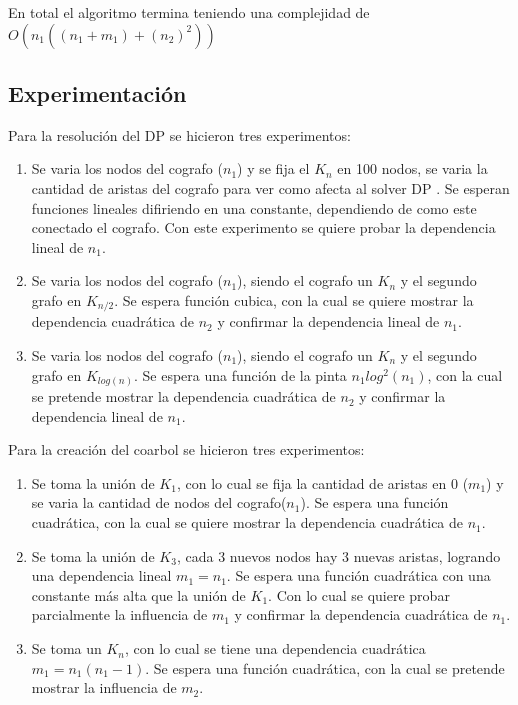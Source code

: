 En total el algoritmo termina teniendo una complejidad de $O(n_1((n_1 + m_1) + (n_2)^2 ))$

\subsection{Experimentación}

    

    Para la resolución del DP se hicieron tres experimentos:

    \begin{enumerate}

        \item Se varia los nodos del cografo ($n_1$) y se fija el $K_n$ en 100 nodos, se varia la cantidad de aristas del cografo para ver como afecta al solver DP . Se esperan funciones lineales difiriendo en una constante, dependiendo de como este conectado el cografo. Con este experimento se quiere probar la dependencia lineal de $n_1$.

        \item Se varia los nodos del cografo ($n_1$), siendo el cografo un $K_n$  y el segundo grafo en $K_{n/2}$. Se espera función cubica, con la cual se quiere mostrar la dependencia cuadrática de $n_2$ y confirmar la dependencia lineal de $n_1$.
        
        \item Se varia los nodos del cografo ($n_1$), siendo el cografo un $K_n$  y el segundo grafo en $K_{log(n)}$. Se espera una función de la pinta $n_1log^2(n_1)$, con la cual se pretende mostrar la dependencia cuadrática de $n_2$ y confirmar la dependencia lineal de $n_1$.

    \end{enumerate}

    Para la creación del coarbol se hicieron tres experimentos:

    \begin{enumerate}

        \item Se toma la unión de $K_1$, con lo cual se fija la cantidad de aristas en $0$ ($m_1$) y se varia la cantidad de nodos del cografo($n_1$). Se espera una función cuadrática, con la cual se quiere mostrar la dependencia cuadrática de $n_1$.

        \item Se toma la unión de $K_3$, cada 3 nuevos nodos hay 3 nuevas aristas, logrando una dependencia lineal $m_1 = n_1$. Se espera una función cuadrática con una constante más alta que la unión de $K_1$. Con lo cual se quiere probar parcialmente la influencia de $m_1$ y confirmar la dependencia cuadrática de $n_1$.
        
        \item Se toma un $K_n$, con lo cual se tiene una dependencia cuadrática $m_1 = n_1(n_1 - 1)$. Se espera una función cuadrática, con la cual se pretende mostrar la influencia de $m_2$.

    \end{enumerate}


